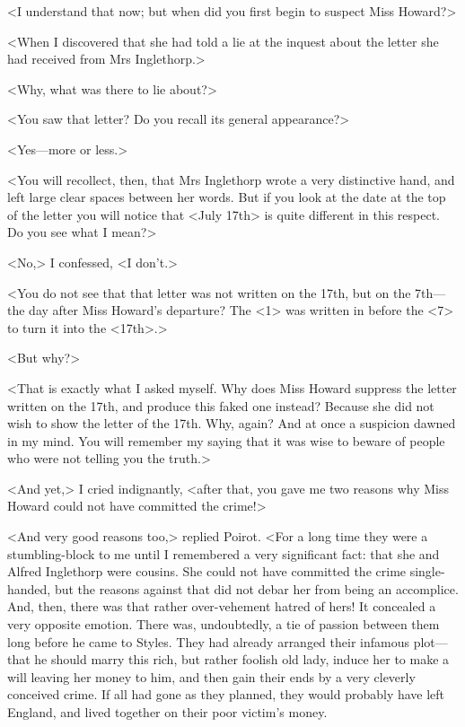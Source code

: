  <I understand that now; but when did you first begin to suspect Miss Howard?> 

 <When I discovered that she had told a lie at the inquest about the letter she had received from Mrs Inglethorp.> 

 <Why, what was there to lie about?> 

 <You saw that letter? Do you recall its general appearance?> 

 <Yes—more or less.> 

 <You will recollect, then, that Mrs Inglethorp wrote a very distinctive hand, and left large clear spaces between her words. But if you look at the date at the top of the letter you will notice that <July 17th> is quite different in this respect. Do you see what I mean?> 

 <No,> I confessed, <I don't.> 

 <You do not see that that letter was not written on the 17th, but on the 7th—the day after Miss Howard's departure? The <1> was written in before the <7> to turn it into the <17th>.> 

 <But why?> 

 <That is exactly what I asked myself. Why does Miss Howard suppress the letter written on the 17th, and produce this faked one instead? Because she did not wish to show the letter of the 17th. Why, again? And at once a suspicion dawned in my mind. You will remember my saying that it was wise to beware of people who were not telling you the truth.> 

 <And yet,> I cried indignantly, <after that, you gave me two reasons why Miss Howard could not have committed the crime!> 

 <And very good reasons too,> replied Poirot. <For a long time they were a stumbling-block to me until I remembered a very significant fact: that she and Alfred Inglethorp were cousins. She could not have committed the crime single-handed, but the reasons against that did not debar her from being an accomplice. And, then, there was that rather over-vehement hatred of hers! It concealed a very opposite emotion. There was, undoubtedly, a tie of passion between them long before he came to Styles. They had already arranged their infamous plot—that he should marry this rich, but rather foolish old lady, induce her to make a will leaving her money to him, and then gain their ends by a very cleverly conceived crime. If all had gone as they planned, they would probably have left England, and lived together on their poor victim's money. 

